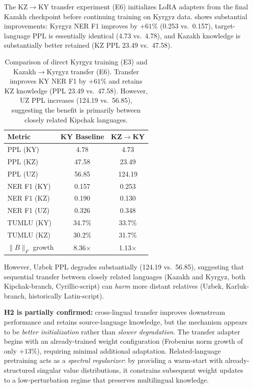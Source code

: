 \documentclass[11pt]{article}
\begin{document}
The KZ$\rightarrow$KY transfer experiment (E6) initializes LoRA adapters from the final Kazakh checkpoint before continuing training on Kyrgyz data.  shows substantial improvements: Kyrgyz NER F1 improves by $+61\%$ (0.253 vs.\ 0.157), target-language PPL is essentially identical (4.73 vs.\ 4.78), and Kazakh knowledge is substantially better retained (KZ PPL 23.49 vs.\ 47.58).

\begin{table}[t]
\centering
\small
\begin{tabular}{lcc}
\toprule
\textbf{Metric} & \textbf{KY Baseline} & \textbf{KZ$\rightarrow$KY} \\
\midrule
PPL (KY) & 4.78 & 4.73 \\
PPL (KZ) & 47.58 & 23.49 \\
PPL (UZ) & 56.85 & 124.19 \\
NER F1 (KY) & 0.157 & 0.253 \\
NER F1 (KZ) & 0.190 & 0.130 \\
NER F1 (UZ) & 0.326 & 0.348 \\
TUMLU (KY) & 34.7\% & 33.7\% \\
TUMLU (KZ) & 30.2\% & 31.7\% \\
$\|B\|_F$ growth & 8.36$\times$ & 1.13$\times$ \\
\bottomrule
\end{tabular}
\caption{Comparison of direct Kyrgyz training (E3) and Kazakh$\rightarrow$Kyrgyz transfer (E6). Transfer improves KY NER F1 by $+61\%$ and retains KZ knowledge (PPL 23.49 vs.\ 47.58). However, UZ PPL increases (124.19 vs.\ 56.85), suggesting the benefit is primarily between closely related Kipchak languages.}
\label{tab:transfer}
\end{table}

However, Uzbek PPL degrades substantially (124.19 vs.\ 56.85), suggesting that sequential transfer between closely related languages (Kazakh and Kyrgyz, both Kipchak-branch, Cyrillic-script) can \emph{harm} more distant relatives (Uzbek, Karluk-branch, historically Latin-script).

\textbf{H2 is partially confirmed:} cross-lingual transfer improves downstream performance and retains source-language knowledge, but the mechanism appears to be \emph{better initialization} rather than \emph{slower degradation}. The transfer adapter begins with an already-trained weight configuration (Frobenius norm growth of only $+13\%$), requiring minimal additional adaptation. Related-language pretraining acts as a \emph{spectral regularizer}: by providing a warm-start with already-structured singular value distributions, it constrains subsequent weight updates to a low-perturbation regime that preserves multilingual knowledge.
\end{document}
